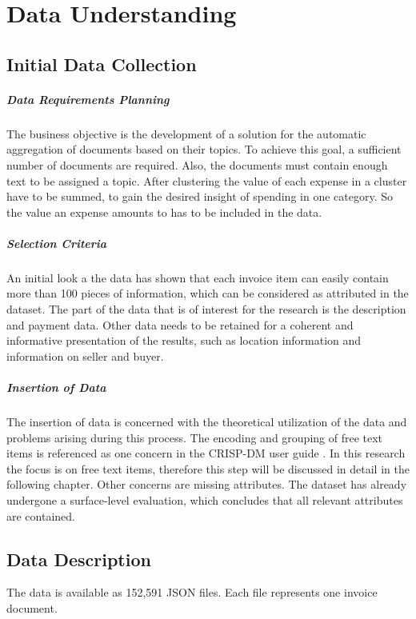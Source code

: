 \chapter{Data Understanding}

\section{Initial Data Collection}

\paragraph{Data Requirements Planning}
The business objective is the development of a solution for the automatic aggregation of documents based on their topics. To achieve this goal, a sufficient number of documents are required. Also, the documents must contain enough text to be assigned a topic. After clustering the value of each expense in a cluster have to be summed, to gain the desired insight of spending in one category. So the value an expense amounts to has to be included in the data.

\paragraph{Selection Criteria}
An initial look a the data has shown that each invoice item can easily contain more than 100 pieces of information, which can be considered as attributed in the dataset. The part of the data that is of interest for the research is the description and payment data. Other data needs to be retained for a coherent and informative presentation of the results, such as location information and information on seller and buyer.

\paragraph{Insertion of Data}
The insertion of data is concerned with the theoretical utilization of the data and problems arising during this process. The encoding and grouping of free text items is referenced as one concern in the \ac{CRISP-DM} user guide \cite[p.~38]{CRISPDM2000}. In this research the focus is on free text items, therefore this step will be discussed in detail in the following chapter. 
Other concerns are missing attributes. The dataset has already undergone a surface-level evaluation, which concludes that all relevant attributes are contained.

\section{Data Description}
The data is available as 152,591 \ac{JSON} files. Each file represents one invoice document. 

